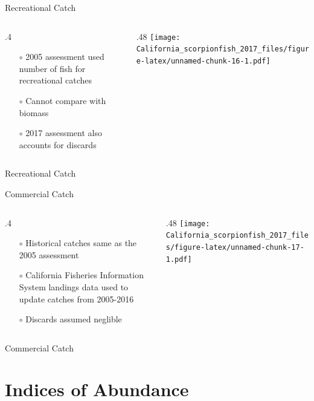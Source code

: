 \documentclass[ignorenonframetext,compress]{beamer}
\def\begincols{\begin{columns}}
\def\begincol{\begin{column}}
\def\endcol{\end{column}}
\def\endcols{\end{columns}}
\begin{document}
\begin{frame}{Recreational Catch}

\begincols
 \begincol{.4\textwidth}

\begin{itemize}
\item[$\circ$] 2005 assessment used number of fish for recreational catches
\item[$\circ$] Cannot compare with biomass
\item[$\circ$] 2017 assessment also accounts for discards
\end{itemize}

\endcol
 \begincol{.48\textwidth}
\texttt{[image: California\_scorpionfish\_2017\_files/figure-latex/unnamed-chunk-16-1.pdf]}
\endcol
\endcols

\end{frame}

\begin{frame}{Recreational Catch}

\end{frame}

\begin{frame}{Commercial Catch}

\begincols
 \begincol{.4\textwidth}

\begin{itemize}
  \item[$\circ$] Historical catches same as the 2005 assessment
  \item[$\circ$] California Fisheries Information System landings data used to update catches from 2005-2016 
  \item[$\circ$] Discards assumed neglible
\end{itemize}

\endcol
 \begincol{.48\textwidth}
\texttt{[image: California\_scorpionfish\_2017\_files/figure-latex/unnamed-chunk-17-1.pdf]}
\endcol
\endcols

\end{frame}

\begin{frame}{Commercial Catch}

\end{frame}

\section{Indices of Abundance}\label{indices-of-abundance}
\end{document}

